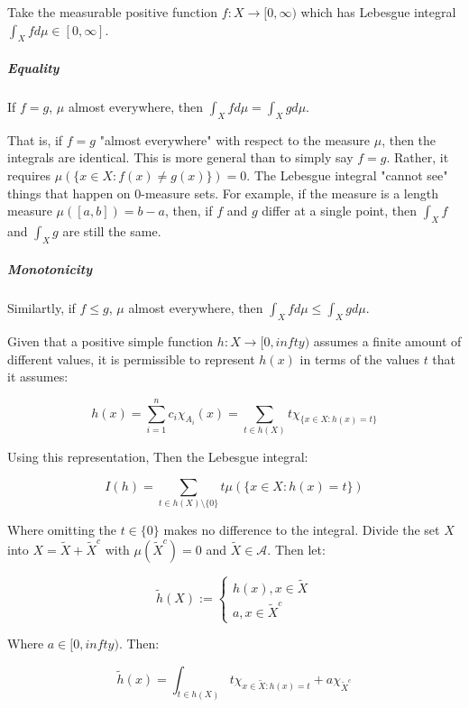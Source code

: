 Take the measurable positive function $f: X\rightarrow [0,\infty)$ which has Lebesgue integral $\int_X f d\mu \in [0,\infty]$. 


\subparagraph{Equality}
If $f=g$, $\mu$ almost everywhere, then $\int_X f d\mu = \int_X g d\mu$. 

That is, if $f=g$ "almost everywhere" with respect to the measure $\mu$, then the integrals are identical. This is more general than to simply say $f=g$. Rather, it requires $\mu(\{x \in X: f(x) \neq g(x) \}) = 0$. The Lebesgue integral "cannot see" things that happen on $0$-measure sets. For example, if the measure is a length measure $\mu ( [a,b] ) = b-a$, then, if $f$ and $g$ differ at a single point, then $\int_X f $ and $\int_X g$ are still the same. 

\subparagraph{Monotonicity}

Similartly, if $f\leq g$,  $\mu$ almost everywhere, then $\int_X f d\mu \leq \int_X g d\mu$.


Given that a positive simple function $h:X \rightarrow [0,infty)$ assumes a finite amount of different values, it is permissible to represent $h(x)$ in terms of the values $t$ that it assumes:

\begin{equation}
h(x) = \sum_{i=1}^n c_i \chi_{A_i} (x) = \sum_{t\in h(X)} t \chi_{\{x\in X: h(x) = t\}}
\end{equation} 

Using this representation, Then the Lebesgue integral:

\begin{equation}
I(h) = \sum_{t\in h(X)\setminus \{0\}} t \mu (\{ x\in X : h(x) = t \} ) 
\end{equation}

Where omitting the $t\in\{0\}$ makes no difference to the integral. Divide the set $X$ into $X = \tilde{X} + \tilde{X}^c$ with $\mu(\tilde{X}^c) = 0 $ and $\tilde{X} \in \mathscr{A}$. Then let:

\begin{equation}
\tilde{h}(X) := \left\{ \begin{array}{l} h(x), x\in \tilde{X}\\ a, x\in \tilde{X}^c \end{array} \right.
\end{equation}

Where $a \in [0, infty)$.  Then:

\begin{equation}
\tilde{h}(x) = \int_{t\in h(X)} t \chi_{x\in \tilde{X}: h(x) = t} + a \chi_{\tilde{X}^c}
\end{equation}

